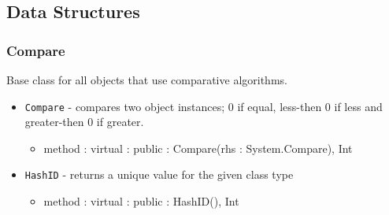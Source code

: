 \documentclass[12pt]{article}
\begin{document}
\subsection{Data Structures}
\subsubsection{Compare}
Base class for all objects that use comparative algorithms.
\begin{itemize}
    \item \texttt{Compare} - compares two object instances; 0 if equal, less-then 0 if less and greater-then 0 if greater. 
    	\begin{itemize}
	\item method : virtual : public : Compare(rhs : System.Compare), Int
	\end{itemize}
   \item \texttt{HashID} - returns a unique value for the given class type
    	\begin{itemize}
	\item method : virtual : public : HashID(), Int
	\end{itemize}	
\end{itemize}
\end{document}
